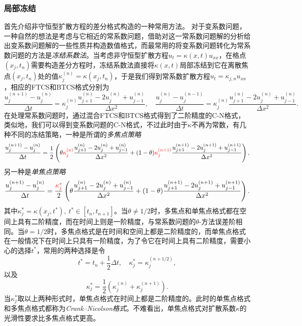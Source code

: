 \documentclass[a4paper,10pt]{ctexart}
\begin{document}
\subsubsection{局部冻结}
首先介绍非守恒型扩散方程的差分格式构造的一种常用方法。
对于变系数问题，一种自然的想法是考虑与它相近的常系数问题，借助对这一常系数问题解的分析给出变系数问题解的一些性质并构造数值格式，而最常用的将变系数问题转化为常系数问题的方法是\emph{冻结系数法}。当考虑非守恒型扩散方程$ u_t = \kappa(x,t) u_{xx} $，在格点$ (x_j,t_n) $需要构造差分方程时，冻结系数法直接将$ \kappa(x,t) $局部冻结到它在离散焦点$ (x_j,t_n) $处的值$ \kappa_{j}^{(n)} = \kappa(x_j,t_n) $，于是我们得到常系数扩散方程$ u_t = \kappa_{j,n} u_{xx} $，相应的FTCS和BTCS格式分别为
\[
    \frac{u^{(n+1)}_j-u^{(n)}_j}{\Delta t} = \kappa_{j}^{(n)} \frac{u^{(n)}_{j+1}-2u^{(n)}_j+u^{(n)}_{j-1}}{\Delta x^2},\quad 
    \frac{u^{(n)}_j-u^{(n-1)}_j}{\Delta t} = \kappa_{j}^{(n)} \frac{u^{(n)}_{j+1}-2u^{(n)}_j+u^{(n)}_{j-1}}{\Delta x^2}.
\]
在处理常系数问题时，通过混合FTCS和BTCS格式得到了二阶精度的C-N格式，类似地，我们可以得到变系数问题的C-N格式，不过此时由于$ \kappa $不再为常数，有几种不同的冻结策略，一种是所谓的\emph{多焦点策略}
\begin{equation}
    \frac{u^{(n+1)}_j-u^{(n)}_j}{\Delta t} = \frac{1}{2} \left(\theta\textcolor{red}{\kappa^{(n)}_j}\frac{u^{(n)}_{j+1}-2u^{(n)}_j+u^{(n)}_{j-1}}{\Delta x^2} + (1-\theta)\textcolor{red}{\kappa^{(n+1)}_j}\frac{u^{(n+1)}_{j+1}-2u^{(n+1)}_j+u^{(n+1)}_{j-1}}{\Delta x^2} \right) ,
\end{equation}
另一种是\emph{单焦点策略}
\begin{equation}
    \frac{u^{(n+1)}_j-u^{(n)}_j}{\Delta t} = \frac{\textcolor{red}{\kappa^*_j}}{2} \left(\theta\frac{u^{(n)}_{j+1}-2u^{(n)}_j+u^{(n)}_{j-1}}{\Delta x^2} + (1-\theta)\frac{u^{(n+1)}_{j+1}-2u^{(n+1)}_j+u^{(n+1)}_{j-1}}{\Delta x^2} \right) .
\end{equation}
其中$ \kappa^*_j = \kappa(x_j,t^*),\ t^*\in[t_n,t_{n+1}] $。当$ \theta\ne 1 / 2 $时，多焦点和单焦点格式都在空间上具有二阶精度，而在时间上则是一阶精度，与常系数问题的$ \theta $-方法误差阶相同。当$ \theta = 1 / 2 $时，多焦点格式是在时间和空间上都是二阶精度的，而单焦点格式在一般情况下在时间上只具有一阶精度，为了令它在时间上具有二阶精度，需要小心的选择$ t^* $，常用的两种选择是令
\[
    t^* = t_n + \frac{1}{2}\Delta t,\quad \kappa_j^* = \kappa^{(n+1 / 2)}_j,
\]
以及
\[
    \kappa^*_j = \frac{1}{2}(\kappa^{(n)}_j+\kappa^{(n+1)}_j).
\]
当$ \kappa^*_j $取以上两种形式时，单焦点格式在时间上都是二阶精度的。此时的单焦点格式和多焦点格式都称为\emph{Crank–Nicolson格式}。不难看出，单焦点格式对扩散系数$ \kappa $的光滑性要求比多焦点格式更高。
\end{document}
